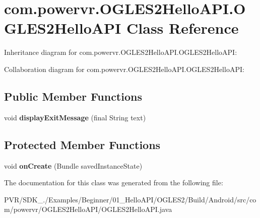 \hypertarget{classcom_1_1powervr_1_1_o_g_l_e_s2_hello_a_p_i_1_1_o_g_l_e_s2_hello_a_p_i}{\section{com.\+powervr.\+O\+G\+L\+E\+S2\+Hello\+A\+P\+I.\+O\+G\+L\+E\+S2\+Hello\+A\+P\+I Class Reference}
\label{classcom_1_1powervr_1_1_o_g_l_e_s2_hello_a_p_i_1_1_o_g_l_e_s2_hello_a_p_i}
}


Inheritance diagram for com.\+powervr.\+O\+G\+L\+E\+S2\+Hello\+A\+P\+I.\+O\+G\+L\+E\+S2\+Hello\+A\+P\+I\+:


Collaboration diagram for com.\+powervr.\+O\+G\+L\+E\+S2\+Hello\+A\+P\+I.\+O\+G\+L\+E\+S2\+Hello\+A\+P\+I\+:
\subsection*{Public Member Functions}
\begin{DoxyCompactItemize}
\item 
\hypertarget{classcom_1_1powervr_1_1_o_g_l_e_s2_hello_a_p_i_1_1_o_g_l_e_s2_hello_a_p_i_a9f1242305ceddfd87c589c034f249e1f}{void {\bfseries display\+Exit\+Message} (final String text)}\label{classcom_1_1powervr_1_1_o_g_l_e_s2_hello_a_p_i_1_1_o_g_l_e_s2_hello_a_p_i_a9f1242305ceddfd87c589c034f249e1f}

\end{DoxyCompactItemize}
\subsection*{Protected Member Functions}
\begin{DoxyCompactItemize}
\item 
\hypertarget{classcom_1_1powervr_1_1_o_g_l_e_s2_hello_a_p_i_1_1_o_g_l_e_s2_hello_a_p_i_a52515fb80dd6ec8ea64cc892e14fbfe6}{void {\bfseries on\+Create} (Bundle saved\+Instance\+State)}\label{classcom_1_1powervr_1_1_o_g_l_e_s2_hello_a_p_i_1_1_o_g_l_e_s2_hello_a_p_i_a52515fb80dd6ec8ea64cc892e14fbfe6}

\end{DoxyCompactItemize}


The documentation for this class was generated from the following file\+:\begin{DoxyCompactItemize}
\item 
P\+V\+R/\+S\+D\+K\+\_./\+Examples/\+Beginner/01\+\_\+\+Hello\+A\+P\+I/\+O\+G\+L\+E\+S2/\+Build/\+Android/src/com/powervr/\+O\+G\+L\+E\+S2\+Hello\+A\+P\+I/O\+G\+L\+E\+S2\+Hello\+A\+P\+I.\+java\end{DoxyCompactItemize}
